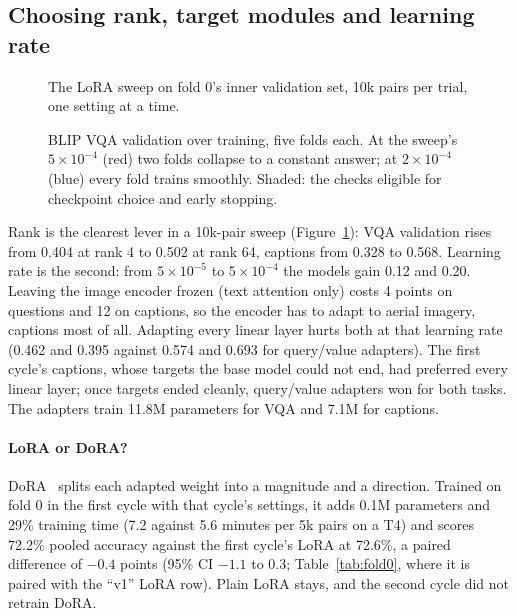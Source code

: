 \documentclass[10pt,twocolumn]{article}
\begin{document}
\subsection{Choosing rank, target modules and learning rate}
\begin{figure}[t]\centering
{}
\caption{The LoRA sweep on fold 0's inner validation set, 10k pairs per trial, one setting at a time.}\label{fig:sweep}
\end{figure}
\begin{figure}[t]\centering
{}
\caption{BLIP VQA validation over training, five folds each. At the sweep's $5\!\times\!10^{-4}$ (red) two folds collapse to a constant answer; at $2\!\times\!10^{-4}$ (blue) every fold trains smoothly. Shaded: the checks eligible for checkpoint choice and early stopping.}\label{fig:lr}
\end{figure}
Rank is the clearest lever in a 10k-pair sweep (Figure~\ref{fig:sweep}): VQA validation rises from 0.404 at rank 4 to 0.502 at rank 64, captions from 0.328 to 0.568. Learning rate is the second: from $5\!\times\!10^{-5}$ to $5\!\times\!10^{-4}$ the models gain 0.12 and 0.20. Leaving the image encoder frozen (text attention only) costs 4 points on questions and 12 on captions, so the encoder has to adapt to aerial imagery, captions most of all. Adapting every linear layer hurts both at that learning rate (0.462 and 0.395 against 0.574 and 0.693 for query/value adapters). The first cycle's captions, whose targets the base model could not end, had preferred every linear layer; once targets ended cleanly, query/value adapters won for both tasks. The adapters train 11.8M parameters for VQA and 7.1M for captions.

\paragraph{LoRA or DoRA?} DoRA~\cite{liu2024dora} splits each adapted weight into a magnitude and a direction. Trained on fold 0 in the first cycle with that cycle's settings, it adds 0.1M parameters and 29\% training time (7.2 against 5.6 minutes per 5k pairs on a T4) and scores 72.2\% pooled accuracy against the first cycle's LoRA at 72.6\%, a paired difference of $-0.4$ points (95\% CI $-1.1$ to 0.3; Table~\ref{tab:fold0}, where it is paired with the ``v1'' LoRA row). Plain LoRA stays, and the second cycle did not retrain DoRA.
\end{document}
